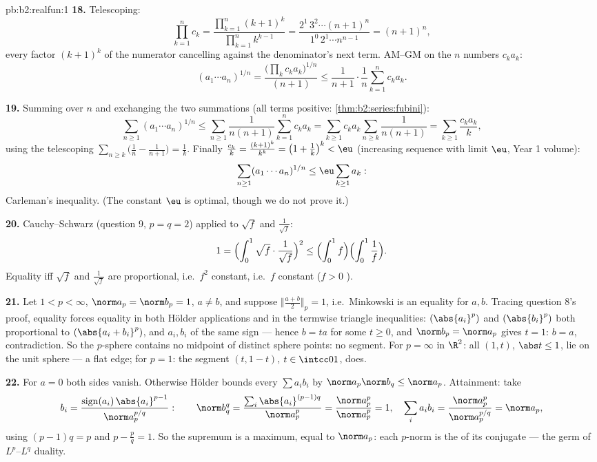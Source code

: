 \begin{solution}{pb:b2:realfun:1}
\textbf{18.} Telescoping:
\[
\prod_{k=1}^{n}c_k = \frac{\prod_{k=1}^n(k+1)^k}
{\prod_{k=1}^{n}k^{k-1}}
= \frac{2^1\,3^2\cdots(n+1)^n}{1^0\,2^1\cdots n^{n-1}}
= (n+1)^n,
\]
every factor $(k+1)^k$ of the numerator cancelling against the
denominator's next term. AM--GM on the $n$ numbers $c_ka_k$:
\[
(a_1\cdots a_n)^{1/n} =
\frac{\bigl(\prod_k c_ka_k\bigr)^{1/n}}{(n+1)}
\leq \frac{1}{n+1}\cdot\frac1n\sum_{k=1}^{n}c_ka_k .
\]

\textbf{19.} Summing over $n$ and exchanging the two summations
(all terms positive: \cref{thm:b2:series:fubini}):
\[
\sum_{n\geq1}(a_1\cdots a_n)^{1/n}
\leq \sum_{n\geq1}\frac{1}{n(n+1)}\sum_{k=1}^{n}c_ka_k
= \sum_{k\geq1}c_ka_k\sum_{n\geq k}\frac1{n(n+1)}
= \sum_{k\geq1}\frac{c_ka_k}{k},
\]
using the telescoping $\sum_{n\geq k}\bigl(\frac1n -
\frac1{n+1}\bigr) = \frac1k$. Finally $\frac{c_k}k =
\frac{(k+1)^k}{k^k} = \bigl(1 + \frac1k\bigr)^k < \eu$
(increasing sequence with limit $\eu$, Year 1 volume):
\[
\sum_{n\geq1}(a_1\cdots a_n)^{1/n} \leq
\eu\sum_{k\geq1}a_k :
\]
Carleman's inequality. (The constant $\eu$ is optimal, though we
do not prove it.)

\textbf{20.} Cauchy--Schwarz (question 9, $p = q = 2$) applied
to $\sqrt f$ and $\frac1{\sqrt f}$:
\[
1 = \Bigl(\int_0^1\sqrt f\cdot\frac{1}{\sqrt f}\Bigr)^{2}
\leq \Bigl(\int_0^1 f\Bigr)\Bigl(\int_0^1\frac1f\Bigr).
\]
Equality iff $\sqrt f$ and $\frac1{\sqrt f}$ are proportional,
i.e.\ $f^2$ constant, i.e.\ $f$ constant ($f > 0$ ).

\textbf{21.} Let $1 < p < \infty$, $\norm a_p = \norm b_p = 1$,
$a \neq b$, and suppose $\bigl\Vert\frac{a+b}2\bigr\Vert_p = 1$,
i.e.\ Minkowski is an equality for $a, b$. Tracing question 8's
proof, equality forces equality in both H\"older applications
and in the termwise triangle inequalities: $(\abs{a_i}^p)$ and
$(\abs{b_i}^p)$ both proportional to $(\abs{a_i + b_i}^p)$, and
$a_i, b_i$ of the same sign --- hence $b = ta$ for some $t \geq
0$, and $\norm b_p = \norm a_p$ gives $t = 1$: $b = a$,
contradiction. So the $p$-sphere contains no midpoint of
distinct sphere points: no segment. For $p = \infty$ in $\R^2$:
all $(1, t)$, $\abs t \leq 1$, lie on the unit sphere --- a flat
edge; for $p = 1$: the segment $(t, 1 - t)$, $t \in \intcc01$,
does.

\textbf{22.} For $a = 0$ both sides vanish. Otherwise H\"older
bounds every $\sum a_ib_i$ by $\norm a_p\norm b_q \leq \norm
a_p$. Attainment: take
\[
b_i = \frac{\operatorname{sign}(a_i)\,\abs{a_i}^{p-1}}
{\norm a_p^{p/q}} :
\qquad
\norm b_q^q = \frac{\sum_i\abs{a_i}^{(p-1)q}}{\norm a_p^{p}}
= \frac{\norm a_p^p}{\norm a_p^p} = 1,
\quad
\sum_ia_ib_i = \frac{\norm a_p^p}{\norm a_p^{p/q}} =
\norm a_p ,
\]
using $(p-1)q = p$ and $p - \frac pq = 1$. So the supremum is a
maximum, equal to $\norm a_p$: each $p$-norm is the   of
its conjugate --- the germ of $L^p$--$L^q$ duality.


\end{solution}
